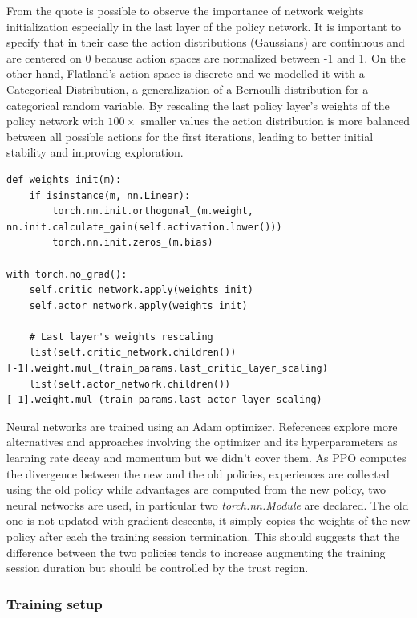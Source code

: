 \documentclass[11pt, a4paper, hidelinks]{report}
\begin{document}
From the quote is possible to observe the importance of network weights initialization especially in the last layer of the policy network.
It is important to specify that in their case the action distributions (Gaussians) are continuous and are centered on 0 because action spaces are normalized between -1 and 1.
On the other hand, Flatland's action space is discrete and we modelled it with a Categorical Distribution, a generalization of a Bernoulli distribution for a categorical random variable.
By rescaling the last policy layer's weights of the policy network with $100\times$ smaller values the action distribution is more balanced between all possible actions for the first iterations, leading to better initial stability and improving exploration.

\begin{lstlisting}[label={lst:psppo-net-init}]
def weights_init(m):
	if isinstance(m, nn.Linear):
		torch.nn.init.orthogonal_(m.weight, nn.init.calculate_gain(self.activation.lower()))
		torch.nn.init.zeros_(m.bias)

with torch.no_grad():
	self.critic_network.apply(weights_init)
	self.actor_network.apply(weights_init)

	# Last layer's weights rescaling
	list(self.critic_network.children())[-1].weight.mul_(train_params.last_critic_layer_scaling)
	list(self.actor_network.children())[-1].weight.mul_(train_params.last_actor_layer_scaling)
\end{lstlisting}

Neural networks are trained using an Adam optimizer.
References explore more alternatives and approaches involving the optimizer and its hyperparameters as learning rate decay and momentum but we didn't cover them.
As PPO computes the divergence between the new and the old policies, experiences are collected using the old policy while advantages are computed from the new policy, two neural networks are used, in particular two \textit{torch.nn.Module} are declared.
The old one is not updated with gradient descents, it simply copies the weights of the new policy after each the training session termination.
This should suggests that the difference between the two policies tends to increase augmenting the training session duration but should be controlled by the trust region.

\subsubsection{Training setup}\label{subsubsec:training-setup}
\end{document}
